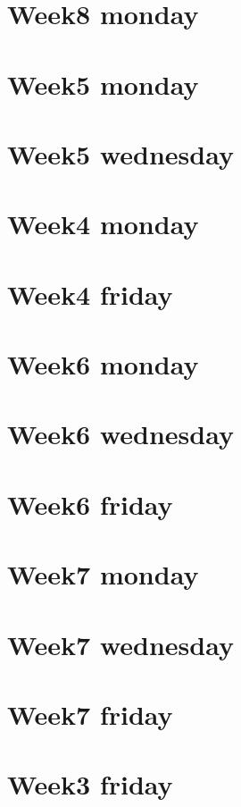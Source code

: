 
\section*{Week8 monday}

\vfill
\section*{Week5 monday}

\vfill
\section*{Week5 wednesday}

\vfill
\section*{Week4 monday}

\vfill
\section*{Week4 friday}

\vfill
\section*{Week6 monday}

\vfill
\section*{Week6 wednesday}

\vfill
\section*{Week6 friday}

\vfill
\section*{Week7 monday}

\vfill
\section*{Week7 wednesday}

\vfill
\section*{Week7 friday}

\vfill
\section*{Week3 friday}

\vfill
